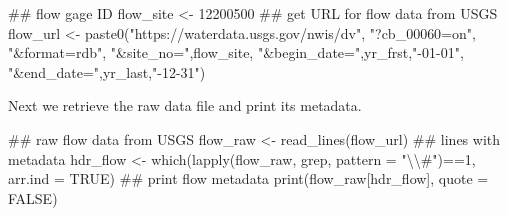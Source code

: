 \documentclass[11pt,]{article}
\newenvironment{Shaded}{}{}
\newcommand{\KeywordTok}[1]{\textcolor[rgb]{0.00,0.00,1.00}{#1}}
\newcommand{\DataTypeTok}[1]{#1}
\newcommand{\DecValTok}[1]{#1}
\newcommand{\CharTok}[1]{\textcolor[rgb]{0.00,0.50,0.50}{#1}}
\newcommand{\StringTok}[1]{\textcolor[rgb]{0.00,0.50,0.50}{#1}}
\newcommand{\OtherTok}[1]{\textcolor[rgb]{1.00,0.25,0.00}{#1}}
\newcommand{\OperatorTok}[1]{#1}
\newcommand{\NormalTok}[1]{#1}
\begin{document}
\begin{Shaded}
\begin{Highlighting}[]
\NormalTok{## flow gage ID}
\NormalTok{flow_site <-}\StringTok{ }\DecValTok{12200500}
\NormalTok{## get URL for flow data from USGS}
\NormalTok{flow_url <-}\StringTok{ }\KeywordTok{paste0}\NormalTok{(}\StringTok{"https://waterdata.usgs.gov/nwis/dv"}\NormalTok{,}
                   \StringTok{"?cb_00060=on"}\NormalTok{,}
                   \StringTok{"&format=rdb"}\NormalTok{,}
                   \StringTok{"&site_no="}\NormalTok{,flow_site,}
                   \StringTok{"&begin_date="}\NormalTok{,yr_frst,}\StringTok{"-01-01"}\NormalTok{,}
                   \StringTok{"&end_date="}\NormalTok{,yr_last,}\StringTok{"-12-31"}\NormalTok{)}
\end{Highlighting}
\end{Shaded}

Next we retrieve the raw data file and print its metadata.

\begin{Shaded}
\begin{Highlighting}[]
\NormalTok{## raw flow data from USGS}
\NormalTok{flow_raw <-}\StringTok{ }\KeywordTok{read_lines}\NormalTok{(flow_url)}
\NormalTok{## lines with metadata}
\NormalTok{hdr_flow <-}\StringTok{ }\KeywordTok{which}\NormalTok{(}\KeywordTok{lapply}\NormalTok{(flow_raw, grep, }\DataTypeTok{pattern =} \StringTok{"}\CharTok{\textbackslash{}\textbackslash{}}\StringTok{#"}\NormalTok{)}\OperatorTok{==}\DecValTok{1}\NormalTok{, }\DataTypeTok{arr.ind =} \OtherTok{TRUE}\NormalTok{)}
\NormalTok{## print flow metadata}
\KeywordTok{print}\NormalTok{(flow_raw[hdr_flow], }\DataTypeTok{quote =} \OtherTok{FALSE}\NormalTok{)}
\end{Highlighting}
\end{Shaded}
\end{document}
